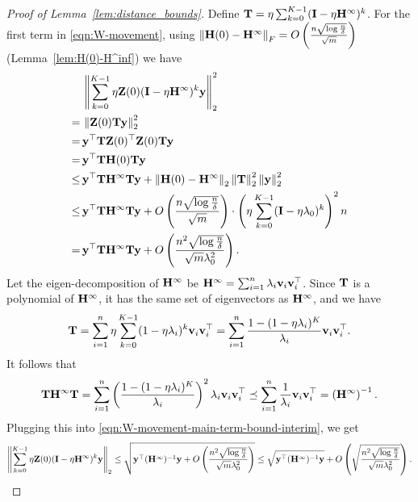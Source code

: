 \begin{proof}[Proof of Lemma~\ref{lem:distance_bounds}]
	Define $\mathbf{T} = \eta \sum_{k=0}^{K-1} (\mathbf{I} - \eta \mathbf{H}^\infty)^k$.
	For the first term in \eqref{eqn:W-movement}, using $\left\|\mathbf{H}(0) - \mathbf{H}^\infty\right\|_F = O\left( \frac{n\sqrt{\log \frac{n}{\delta}}}{\sqrt m} \right)$ (Lemma~\ref{lem:H(0)-H^inf}) we have
	\begin{equation} \label{eqn:W-movement-main-term-bound-interim}
	\begin{aligned}
	&\left\|\sum_{k=0}^{K-1} \eta \mathbf{Z}(0) (\mathbf{I} - \eta \mathbf{H}^\infty)^k \mathbf{y}\right\|_2^2 \\
	=\,& \left\| \mathbf{Z}(0) \mathbf{T}  \mathbf{y}\right\|_2^2 \\
	=\,&  \mathbf{y}^\top \mathbf{T} \mathbf{Z}(0)^\top \mathbf{Z}(0) \mathbf{T} \mathbf{y} \\
	=\,&  \mathbf{y}^\top \mathbf{T} \mathbf{H}(0)  \mathbf{T} \mathbf{y} \\
	\le\,&  \mathbf{y}^\top \mathbf{T} \mathbf{H}^\infty  \mathbf{T} \mathbf{y}  +    \left\|\mathbf{H}(0) - \mathbf{H}^\infty\right\|_2  \left\|\mathbf{T}\right\|_2^2 \left\|\mathbf{y}\right\|_2^2 \\
	\le \,&  \mathbf{y}^\top \mathbf{T} \mathbf{H}^\infty  \mathbf{T} \mathbf{y}  +    O\left( \frac{n\sqrt{\log \frac{n}{\delta}}}{\sqrt m} \right) \cdot  \left( \eta \sum_{k=0}^{K-1} (\mathbf{I} - \eta \lambda_0)^k\right)^2 n \\
	= \,&  \mathbf{y}^\top \mathbf{T} \mathbf{H}^\infty  \mathbf{T} \mathbf{y}  +    O\left( \frac{n^2\sqrt{\log \frac{n}{\delta}}}{\sqrt m \lambda_0^2} \right) .
	\end{aligned}
	\end{equation}
	Let the eigen-decomposition of $\mathbf{H}^\infty$ be $\mathbf{H}^\infty = \sum_{i=1}^n \lambda_i \mathbf{v}_i \mathbf{v}_i^\top$.
	Since $\mathbf{T}$ is a polynomial of $\mathbf{H}^\infty$, it has the same set of eigenvectors as $\mathbf{H}^\infty$, and we have
	\begin{align*}
	\mathbf{T}  = \sum_{i=1}^n \eta \sum_{k=0}^{K-1} (1 - \eta \lambda_i)^k \mathbf{v}_i \mathbf{v}_i^\top
	= \sum_{i=1}^n \frac{1 - (1 - \eta \lambda_i)^{K}}{\lambda_i} \mathbf{v}_i \mathbf{v}_i^\top.
	\end{align*}
	It follows that
	\begin{align*}
	\mathbf{T} \mathbf{H}^\infty  \mathbf{T}
	= \sum_{i=1}^n \left( \frac{1 - (1 - \eta \lambda_i)^{K}}{\lambda_i} \right)^2 \lambda_i  \mathbf{v}_i \mathbf{v}_i^\top
	\preceq \sum_{i=1}^n \frac{1}{\lambda_i}\mathbf{v}_i \mathbf{v}_i^\top
	= \left( \mathbf{H}^\infty \right)^{-1}.
	\end{align*}
	Plugging this into \eqref{eqn:W-movement-main-term-bound-interim}, we get
	\begin{equation} \label{eqn:W-movement-main-term-bound}
	\left\|\sum_{k=0}^{K-1} \eta \mathbf{Z}(0) (\mathbf{I} - \eta \mathbf{H}^\infty)^k \mathbf{y}\right\|_2
	\le \sqrt{\mathbf{y}^\top (\mathbf{H}^\infty)^{-1} \mathbf{y}  +    O\left( \frac{n^2\sqrt{\log \frac{n}{\delta}}}{\sqrt m \lambda_0^2} \right) }
	\le \sqrt{\mathbf{y}^\top (\mathbf{H}^\infty)^{-1} \mathbf{y}}  +    O\left( \sqrt{\frac{n^2\sqrt{\log \frac{n}{\delta}}}{\sqrt m \lambda_0^2} } \right) .
	\end{equation}
	

\end{proof}
